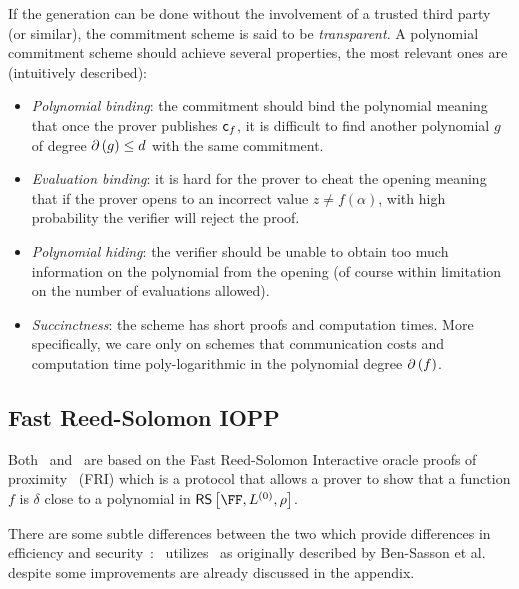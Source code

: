 \documentclass[a4paper,10pt]{article}
\begin{document}
		If the generation can be done without the involvement of a trusted third party (or similar),
		the commitment scheme is said to be \emph{transparent}.
		A polynomial commitment scheme should achieve several properties, the most relevant ones are
		(intuitively described):
		
		\begin{itemize}
			\item \emph{Polynomial binding}:	the commitment should bind the polynomial meaning that once
				the prover publishes $\textsf{c}_{f}$, it is difficult to find another polynomial $g$ of degree
				$\partial\left({g}\right) \leq d$ with the same commitment.
			
			\item \emph{Evaluation binding}: it is hard for the prover to cheat the opening meaning that
				if the prover opens to an incorrect value $z \neq f(\alpha)$, with high probability the
				verifier will reject the proof.
				
			\item \emph{Polynomial hiding}: the verifier should be unable to obtain too much information
				on the polynomial from the opening (of course within limitation on the number of evaluations
				allowed).
			
			\item \emph{Succinctness}: the scheme has short proofs and computation times.
				More specifically, we care only on schemes that communication costs and computation time
				poly-logarithmic in the polynomial degree $\partial\left({f}\right)$.
		\end{itemize}
		


		\subsection{Fast Reed-Solomon IOPP}
		
			Both \redshift\ and \plonkyy\ are based on the Fast Reed-Solomon Interactive oracle proofs
			of proximity~\cite{ICALP:BBHR18} (FRI) which is a protocol that allows a prover to 
			show that a function $f$ is $\delta$ close to a polynomial in $\rs{\FF}{L^{(0)}}{\rho}$.
			
			There are some subtle differences between the two which provide differences in efficiency
			and security~\cite[Sec.6.2]{Plonky2}:
			\redshift\ utilizes \FRI\ as originally described by Ben-Sasson et al.~\cite{ICALP:BBHR18}
			despite some improvements are already discussed in the appendix.
			
\end{document}
